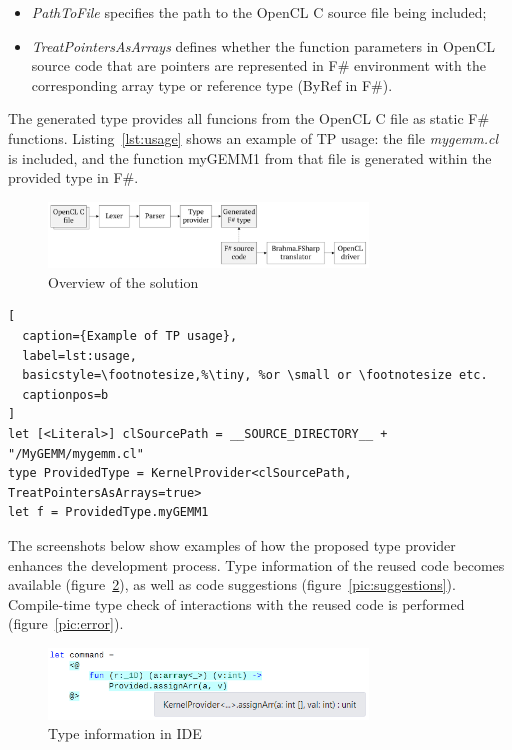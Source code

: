 \documentclass[sigplan,review]{acmart}\settopmatter{printfolios=true}
\begin{document}
\begin{itemize}
  \item \textit{PathToFile} specifies the path to the OpenCL C source file being included;
  \item \textit{TreatPointersAsArrays} defines whether the function parameters in OpenCL source code that are pointers are represented in F\# environment with the corresponding array type or reference type (ByRef in F\#).
\end{itemize}

The generated type provides all funcions from the OpenCL C file as static F\# functions. Listing~\ref{lst:usage} shows an example of TP usage: the file \textit{mygemm.cl} is included, and the function myGEMM1 from that file is generated within the provided type in F\#.

\begin{figure}[h]
\centering
\includegraphics[width=8.5cm]{graphics/architecture.pdf}
\caption{Overview of the solution}
\label{architecture}
\end{figure}


\lstset{language=FSharp}
\begin{lstlisting}[
  caption={Example of TP usage},
  label=lst:usage,
  basicstyle=\footnotesize,%\tiny, %or \small or \footnotesize etc.
  captionpos=b
]
let [<Literal>] clSourcePath = __SOURCE_DIRECTORY__ + "/MyGEMM/mygemm.cl"
type ProvidedType = KernelProvider<clSourcePath, TreatPointersAsArrays=true>
let f = ProvidedType.myGEMM1
\end{lstlisting}

The screenshots below show examples of how the proposed type provider enhances the development process. Type information of the reused code becomes available (figure~\ref{pic:intellisense}), as well as code suggestions (figure~\ref{pic:suggestions}). Compile-time type check of interactions with the reused code is performed (figure~\ref{pic:error}).

\begin{figure}[h]
\centering
\includegraphics[width=8.5cm]{graphics/example-suggestion.png}
\caption{Type information in IDE}
\label{pic:intellisense}
\end{figure}
\end{document}

